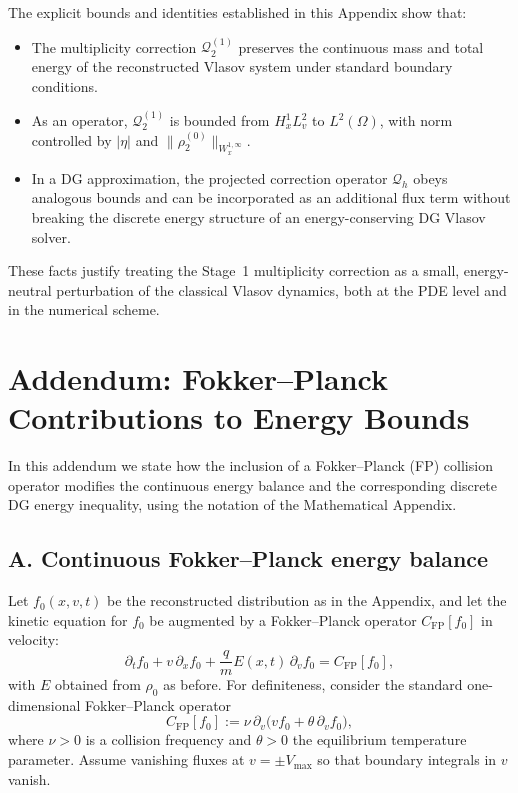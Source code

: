 \documentclass[11pt]{article}
\begin{document}
The explicit bounds and identities established in this Appendix show that:
\begin{itemize}
  \item The multiplicity correction $\mathcal{Q}_2^{(1)}$ preserves the
        continuous mass and total energy of the reconstructed Vlasov system
        under standard boundary conditions.
  \item As an operator, $\mathcal{Q}_2^{(1)}$ is bounded from
        $H^1_x L^2_v$ to $L^2(\Omega)$, with norm controlled by
        $|\eta|$ and $\|\rho_2^{(0)}\|_{W^{1,\infty}_x}$.
  \item In a DG approximation, the projected correction operator
        $\mathcal{Q}_h$ obeys analogous bounds and can be incorporated as an
        additional flux term without breaking the discrete energy structure of
        an energy-conserving DG Vlasov solver.
\end{itemize}
These facts justify treating the Stage~1 multiplicity correction as a small,
energy-neutral perturbation of the classical Vlasov dynamics, both at the
PDE level and in the numerical scheme.

\section*{Addendum: Fokker--Planck Contributions to Energy Bounds}

In this addendum we state how the inclusion of a Fokker--Planck (FP) collision
operator modifies the continuous energy balance and the corresponding discrete
DG energy inequality, using the notation of the Mathematical Appendix.

\subsection*{A. Continuous Fokker--Planck energy balance}

Let $f_0(x,v,t)$ be the reconstructed distribution as in the Appendix, and let
the kinetic equation for $f_0$ be augmented by a Fokker--Planck operator
$C_{\mathrm{FP}}[f_0]$ in velocity:
\begin{equation}
  \partial_t f_0 + v\,\partial_x f_0
  + \frac{q}{m}E(x,t)\,\partial_v f_0
  = C_{\mathrm{FP}}[f_0],
  \label{eq:FP_vlasov_addendum}
\end{equation}
with $E$ obtained from $\rho_0$ as before. For definiteness, consider the
standard one-dimensional Fokker--Planck operator
\begin{equation}
  C_{\mathrm{FP}}[f_0]
  :=
  \nu\,\partial_v\big( v f_0 + \theta\,\partial_v f_0 \big),
  \label{eq:FP_operator_addendum}
\end{equation}
where $\nu>0$ is a collision frequency and $\theta>0$ the equilibrium
temperature parameter. Assume vanishing fluxes at $v=\pm V_{\max}$ so that
boundary integrals in $v$ vanish.
\end{document}
